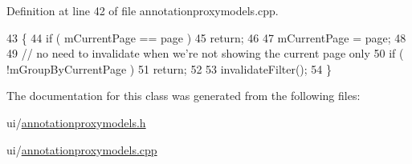 Definition at line 42 of file annotationproxymodels.\+cpp.


\begin{DoxyCode}
43 \{
44   \textcolor{keywordflow}{if} ( mCurrentPage == page )
45     \textcolor{keywordflow}{return};
46 
47   mCurrentPage = page;
48 
49   \textcolor{comment}{// no need to invalidate when we're not showing the current page only}
50   \textcolor{keywordflow}{if} ( !mGroupByCurrentPage )
51     \textcolor{keywordflow}{return};
52 
53   invalidateFilter();
54 \}
\end{DoxyCode}


The documentation for this class was generated from the following files\+:\begin{DoxyCompactItemize}
\item 
ui/\hyperlink{annotationproxymodels_8h}{annotationproxymodels.\+h}\item 
ui/\hyperlink{annotationproxymodels_8cpp}{annotationproxymodels.\+cpp}\end{DoxyCompactItemize}
